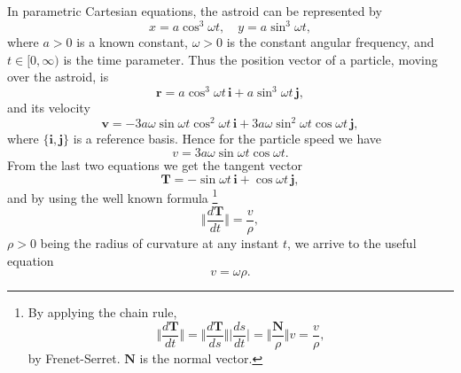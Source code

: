 \documentclass[12pt]{article}
\begin{document}
In parametric Cartesian equations, the astroid can be represented by
$$x = a\cos^3\omega t,\quad y = a\sin^3\omega t,$$
where $a>0$ is a known constant, $\omega>0$ is the constant angular frequency, and $t\in [0,\infty)$ is the time parameter. Thus the position vector of a particle, moving over the astroid, is
$$\mathbf{r}=a\cos^3\omega t\,\mathbf{i}+a\sin^3\omega t\,\mathbf{j},$$
and its velocity
$$\mathbf{v}=-3a\omega\sin\omega t\cos^2\omega t\,\mathbf{i}+3a\omega\sin^2\omega t\cos\omega t\,\mathbf{j},$$
where $\{\mathbf{i},\mathbf{j}\}$ is a reference basis. Hence for the particle speed we have
$$v=3a\omega\sin\omega t\cos\omega t.$$
From the last two equations we get the tangent vector 
$$\mathbf{T}=-\sin\omega t\,\mathbf{i}+\cos\omega t\,\mathbf{j},$$
and by using the well known formula {\footnote{By applying the chain rule,
$$\bigg\Vert\frac{d\mathbf{T}}{dt}\bigg\Vert=\bigg\Vert\frac{d\mathbf{T}}{ds}\bigg\Vert\bigg\vert\frac{ds}{dt}\bigg\vert=
\bigg\Vert\frac{\mathbf{N}}{\rho}\bigg\Vert v=\frac{v}{\rho},$$
by Frenet-Serret. $\mathbf{N}$ is the normal vector.}}
$$\bigg\Vert\frac{d\mathbf{T}}{dt}\bigg\Vert=\frac{v}{\rho},$$
$\rho>0$ being the radius of curvature at any instant $t$, we arrive to the useful equation
$$v=\omega\rho.$$

\end{document}
